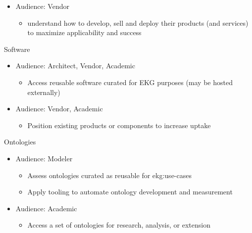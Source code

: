\begin{basedescript}{%
    \desclabelstyle{\multilinelabel}
    \desclabelwidth{2cm}
}
\begin{itemize}
            \begin{itemize}
                \item Reduce the risk and cost associated with new \gls{ekg} projects
            \end{itemize}
            \item Audience: Vendor
            \begin{itemize}
                \item understand how to develop, sell and deploy their products (and services)
                  to maximize applicability and success
            \end{itemize}
        \end{itemize}
    \item[Software]
        \begin{itemize}
            \item Audience: Architect, Vendor, Academic
                \begin{itemize}
                    \item Access reusable software curated for EKG purposes (may be hosted externally)
                \end{itemize}
            \item Audience: Vendor, Academic
                \begin{itemize}
                    \item Position existing products or components to increase uptake
                \end{itemize}
        \end{itemize}
    \item[Ontologies]
        \begin{itemize}
            \item Audience: Modeler
                \begin{itemize}
                    \item Assess ontologies curated as reusable for \glspl{ekg:use-case}
                    \item Apply tooling to automate ontology development and measurement
                \end{itemize}
            \item Audience: Academic
                \begin{itemize}
                    \item Access a set of ontologies for research, analysis, or extension
                \end{itemize}
        \end{itemize}

\end{basedescript}
